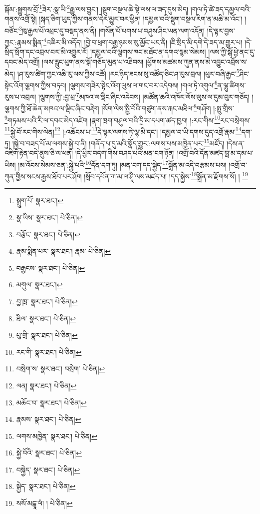 སྐོམ་:སྐྱུགས་བྲོ་\footnote{སྐྲུག་པོ་  སྣར་ཐང་། }ཟེར་:སྣ་ཡི་\footnote{སྣ་ཡིས་  སྣར་ཐང་།  པེ་ཅིན། }རྒྱུ་ལས་བྱུང་། །སྡུག་བསྔལ་ཆེ་སྟེ་ལས་ལ་ཟད་དུས་མེད། །གལ་ཏེ་ཚེ་ཟད་དམྱལ་བའི་གནས་འགྲོ་སྟེ། །སྐད་ཅིག་ཡུད་ཀྱིས་གནས་དེར་མྱུར་བར་ཕྱིན། །དམྱལ་བའི་སྡུག་བསྔལ་རིག་ན་མཆི་མ་འོང་། །བཙོང་\footnote{བརྩོང་  སྣར་ཐང་།  པེ་ཅིན། }ཁུ་རྒྱལ་པོ་འཕྲང་དུ་བསྡད་ནས་ནི། །གསོན་པོ་པགས་པ་བཤུས་ཤིང་ཡན་ལག་འདོན། །དེ་ལྟར་བྱས་ཀྱང་:རྣམས་སྨིན་\footnote{རྣམ་སྨིན་པར་  སྣར་ཐང་། རྣམ་  པེ་ཅིན། }འཆིར་མི་འདོད། །བྱེ་བ་ཕྲག་བརྒྱ་ཉམས་སུ་མྱོང་ཡང་ནི། །ཇི་སྲིད་མི་དགེ་དེ་ཟད་མ་གྱུར་པ། །དེ་སྲིད་སྲོག་དང་འབྲལ་བར་མི་འགྱུར་རོ། །དམྱལ་བའི་ལྕགས་ཁང་མཐོང་ན་དགའ་སྙམ་སེམས། །ལས་ཀྱི་སྒོ་ཕྱེ་ནང་དུ་དབང་མེད་འགྲོ། །ལས་རླུང་ཕུག་ནས་སྒོ་གཅོད་མུན་པ་འཐིབས། །ཕྱོགས་མཚམས་ཀུན་ནས་མེ་འབྱུང་འབྲོས་ས་མེད། །ཤ་རུས་ཚིག་ཀྱང་འཆི་རུ་ལས་ཀྱིས་འཚོ། །རང་ཉིད་ཟངས་སུ་འཚོད་ཅིང་ཤ་རུས་བྲལ། །ཕུར་བཞི་རྒྱང་\footnote{བརྒྱངས་  སྣར་ཐང་།  པེ་ཅིན། }ཤིང་སྟེང་འོག་ལྕགས་ཀྱིས་བཏབ། །ལྕགས་གཟེར་སྟེང་འོག་ལུས་ལ་གང་བར་འདེབས། །གལ་ཏེ་འགུལ་\footnote{མགུལ་  སྣར་ཐང་། }ན་ལྷུ་ཚིགས་རུས་པ་འབྲལ། །ལྕགས་ཀྱི་:བྱ་ཕྲ་\footnote{བྱ་ཁྲ་  སྣར་ཐང་།  པེ་ཅིན། }མཁའ་ལ་ལྡིང་ཞིང་འདེབས། །མཚོན་ཆའི་འཁོར་ལོས་ལུས་ལ་དུམ་བུར་གཅོད། །ལྕགས་ཀྱི་ཐོ་ཆེན་མཁའ་ལ་ལྡིང་ཞིང་བརྡེག །སོག་ལེས་སྤྱི་བོའི་གཙུག་ནས་རྐང་མཐིལ་\footnote{ཐིལ་  སྣར་ཐང་།  པེ་ཅིན། }གཤོག །:སྤུ་གྲིས་\footnote{པུ་གྲི་  སྣར་ཐང་།  པེ་ཅིན། }གཏམས་པའི་རི་ལ་དབང་མེད་འཛེག །རྣག་ཁྲག་བཤུལ་བའི་དྲི་མ་དཔག་ཚད་ཁྱབ། །:རང་གིས་\footnote{རང་གི་  སྣར་ཐང་།  པེ་ཅིན། }རང་བསྲེགས་\footnote{བསྲེག་ས་  སྣར་ཐང་། བསྲེག་  པེ་ཅིན། }སྐྱེ་བོ་རང་གིས་ལེན།\footnote{ལན།  སྣར་ཐང་།  པེ་ཅིན། } །:འཆོངས་པ་\footnote{མཆོང་བ་  སྣར་ཐང་།  པེ་ཅིན། }དེ་ལྟར་ལགས་ཏེ་ལྷ་མི་དང་། །དམྱལ་བ་ཡི་དགས་དུད་འགྲོ་རྣམ་\footnote{རྣམས་  སྣར་ཐང་།  པེ་ཅིན། }དག་ཏུ། །སྐྱེ་བ་བཟད་པོ་མ་ལགས་སྐྱེ་བ་ནི། །གནོད་པ་དུ་མའི་སྣོད་གྱུར་:ལགས་པས་མཁྱེན་པར་\footnote{ལགས་མཁྱེན་  སྣར་ཐང་།  པེ་ཅིན། }མཛོད། །དེས་ན་འཇིག་རྟེན་བདེ་ནུས་ཅི་ལ་ཕན། །དེ་ཕྱིར་བདག་གིས་བཤད་པའི་མན་ངག་ཉོན། །འགྲོ་བའི་དོན་མཛད་བླ་མ་དམ་པ་ཡིས། །མ་འོངས་སེམས་ཅན་:སྐྱེ་པའི་\footnote{སྐྱེ་བོའི་  སྣར་ཐང་།  པེ་ཅིན། }དོན་དག་ཏུ། །མན་ངག་དད་སྐྱེད་\footnote{བསྐྱེད་  སྣར་ཐང་།  པེ་ཅིན། }སྒྲོན་མ་འདི་བརྩམས་པས། །འགྲོ་བ་ཀུན་གྱིས་སངས་རྒྱས་ཐོབ་པར་ཤོག །སློབ་དཔོན་ཀ་མ་ལ་ཤཱི་ལས་མཛད་པ། །དད་སྐྱེས་\footnote{སྐྱེད་  སྣར་ཐང་།  པེ་ཅིན། }སྒྲོན་མ་རྫོགས་སོ། ། \footnote{སསོ་མངྒཱ་ལཾ། །   པེ་ཅིན། }